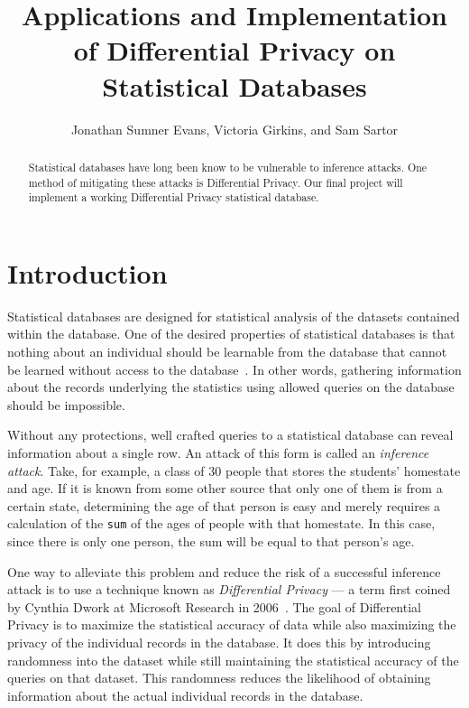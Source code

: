 \documentclass{IEEEtran}
\title{Applications and Implementation of Differential Privacy on Statistical
Databases}
\author{Jonathan Sumner Evans, Victoria Girkins, and Sam Sartor}
\begin{document}
\maketitle

\begin{abstract}
Statistical databases have long been know to be vulnerable to inference attacks.
One method of mitigating these attacks is Differential Privacy. Our final
project will implement a working Differential Privacy statistical database.
\end{abstract}

\section{Introduction}
Statistical databases are designed for statistical analysis of the datasets
contained within the database. One of the desired properties of statistical
databases is that nothing about an individual should be learnable from the
database that cannot be learned without access to the
database~\cite{Dwork:2006:DP}. In other words, gathering information about the
records underlying the statistics using allowed queries on the database should
be impossible.

Without any protections, well crafted queries to a statistical database can
reveal information about a single row. An attack of this form is called an
\textit{inference attack}. Take, for example, a class of 30 people that stores
the students' homestate and age.  If it is known from some other source that
only one of them is from a certain state, determining the age of that person is
easy and merely requires a calculation of the \texttt{sum} of the ages of people
with that homestate. In this case, since there is only one person, the sum will
be equal to that person's age.

One way to alleviate this problem and reduce the risk of a successful inference
attack is to use a technique known as \textit{Differential Privacy} --- a term
first coined by Cynthia Dwork at Microsoft Research in
2006~\cite{Hilton:DP:history}. The goal of Differential Privacy is to maximize
the statistical accuracy of data while also maximizing the privacy of the
individual records in the database. It does this by introducing randomness into
the dataset while still maintaining the statistical accuracy of the queries on
that dataset. This randomness reduces the likelihood of obtaining information
about the actual individual records in the database.
\end{document}
